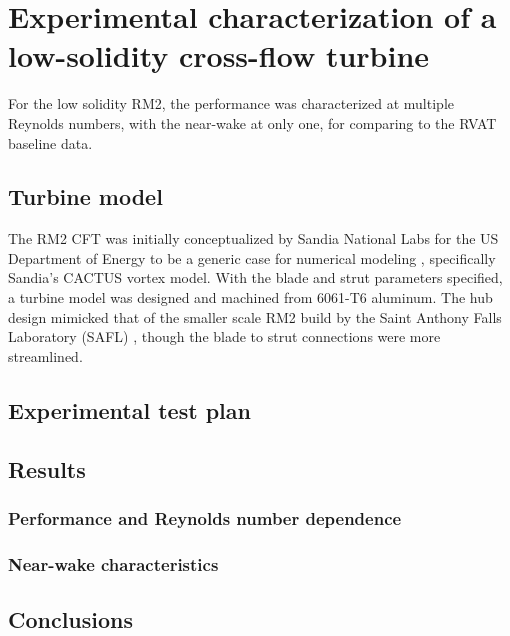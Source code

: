 \chapter{Experimental characterization of a low-solidity cross-flow turbine}
\label{chap:RM2}

For the low solidity RM2, the performance was characterized at multiple Reynolds
numbers, with the near-wake at only one, for comparing to the RVAT baseline
data.


\section{Turbine model}

The RM2 CFT was initially conceptualized by Sandia National Labs for the US
Department of Energy to be a generic case for numerical modeling
\cite{Barone2011}, specifically Sandia's CACTUS vortex model. With the blade and
strut parameters specified, a turbine model was designed and machined from
6061-T6 aluminum. The hub design mimicked that of the smaller scale RM2 build by
the Saint Anthony Falls Laboratory (SAFL) \cite{Hill2014}, though the blade to
strut connections were more streamlined.


\section{Experimental test plan}


\section{Results}


\subsection{Performance and Reynolds number dependence}


\subsection{Near-wake characteristics}


\section{Conclusions}

